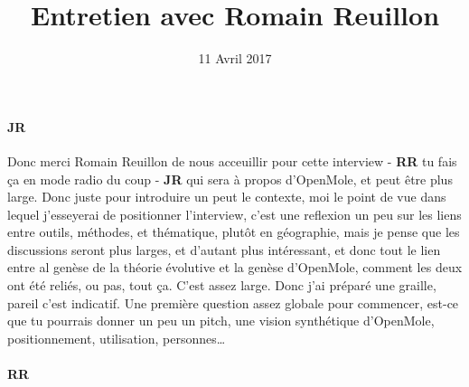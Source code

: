 \documentclass[12pt]{article}
\title{Entretien avec Romain Reuillon}
\date{11 Avril 2017}
\begin{document}
\maketitle

\paragraph{JR}

Donc merci Romain Reuillon de nous acceuillir pour cette interview - \textbf{RR} tu fais ça en mode radio du coup - \textbf{JR} qui sera à propos d'OpenMole, et peut être plus large. Donc juste pour introduire un peut le contexte, moi le point de vue dans lequel j'esseyerai de positionner l'interview, c'est une reflexion un peu sur les liens entre outils, méthodes, et thématique, plutôt en géographie, mais je pense que les discussions seront plus larges, et d'autant plus intéressant, et donc tout le lien entre al genèse de la théorie évolutive et la genèse d'OpenMole, comment les deux ont été reliés, ou pas, tout ça. C'est assez large. Donc j'ai préparé une graille, pareil c'est indicatif. Une première question assez globale pour commencer, est-ce que tu pourrais donner un peu un pitch, une vision synthétique d'OpenMole, positionnement, utilisation, personnes\ldots

\paragraph{RR}
\end{document}
